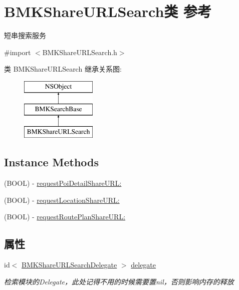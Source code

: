 \hypertarget{interface_b_m_k_share_u_r_l_search}{}\section{B\+M\+K\+Share\+U\+R\+L\+Search类 参考}
\label{interface_b_m_k_share_u_r_l_search}


短串搜索服务  




{\ttfamily \#import $<$B\+M\+K\+Share\+U\+R\+L\+Search.\+h$>$}

类 B\+M\+K\+Share\+U\+R\+L\+Search 继承关系图\+:\begin{figure}[H]
\begin{center}
\leavevmode
\includegraphics[height=3.000000cm]{interface_b_m_k_share_u_r_l_search}
\end{center}
\end{figure}
\subsection*{Instance Methods}
\begin{DoxyCompactItemize}
\item 
(B\+O\+O\+L) -\/ \hyperlink{interface_b_m_k_share_u_r_l_search_a91351e2591a3918fc233ba8ca42c83be}{request\+Poi\+Detail\+Share\+U\+R\+L\+:}
\item 
(B\+O\+O\+L) -\/ \hyperlink{interface_b_m_k_share_u_r_l_search_a42ece3de1f45f2fd3be760f78e37b9b2}{request\+Location\+Share\+U\+R\+L\+:}
\item 
(B\+O\+O\+L) -\/ \hyperlink{interface_b_m_k_share_u_r_l_search_a49e2fa1189af1506ef434e73f33c9aa3}{request\+Route\+Plan\+Share\+U\+R\+L\+:}
\end{DoxyCompactItemize}
\subsection*{属性}
\begin{DoxyCompactItemize}
\item 
\hypertarget{interface_b_m_k_share_u_r_l_search_af3d6d7b5ecf6c9b09b292c1684dad3db}{}id$<$ \hyperlink{protocol_b_m_k_share_u_r_l_search_delegate-p}{B\+M\+K\+Share\+U\+R\+L\+Search\+Delegate} $>$ \hyperlink{interface_b_m_k_share_u_r_l_search_af3d6d7b5ecf6c9b09b292c1684dad3db}{delegate}\label{interface_b_m_k_share_u_r_l_search_af3d6d7b5ecf6c9b09b292c1684dad3db}

\begin{DoxyCompactList}\small\item\em 检索模块的\+Delegate，此处记得不用的时候需要置nil，否则影响内存的释放 \end{DoxyCompactList}\end{DoxyCompactItemize}


